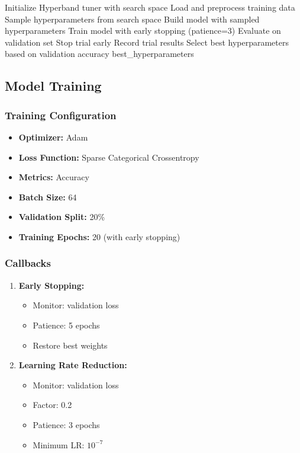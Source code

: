 \documentclass[12pt,a4paper]{article}
\begin{document}
\begin{algorithm}
\caption{Hyperparameter Optimization Process}
\begin{algorithmic}[1]
\State Initialize Hyperband tuner with search space
\State Load and preprocess training data
    \State Sample hyperparameters from search space
    \State Build model with sampled hyperparameters
    \State Train model with early stopping (patience=3)
    \State Evaluate on validation set
        \State Stop trial early
    \EndIf
    \State Record trial results
\EndFor
\State Select best hyperparameters based on validation accuracy
\State \Return best\_hyperparameters
\end{algorithmic}
\end{algorithm}

\subsection{Model Training}

\subsubsection{Training Configuration}
\begin{itemize}
    \item \textbf{Optimizer:} Adam
    \item \textbf{Loss Function:} Sparse Categorical Crossentropy
    \item \textbf{Metrics:} Accuracy
    \item \textbf{Batch Size:} 64
    \item \textbf{Validation Split:} 20\%
    \item \textbf{Training Epochs:} 20 (with early stopping)
\end{itemize}

\subsubsection{Callbacks}
\begin{enumerate}
    \item \textbf{Early Stopping:}
    \begin{itemize}
        \item Monitor: validation loss
        \item Patience: 5 epochs
        \item Restore best weights
    \end{itemize}
    
    \item \textbf{Learning Rate Reduction:}
    \begin{itemize}
        \item Monitor: validation loss
        \item Factor: 0.2
        \item Patience: 3 epochs
        \item Minimum LR: $10^{-7}$
    \end{itemize}
\end{enumerate}
\end{document}
